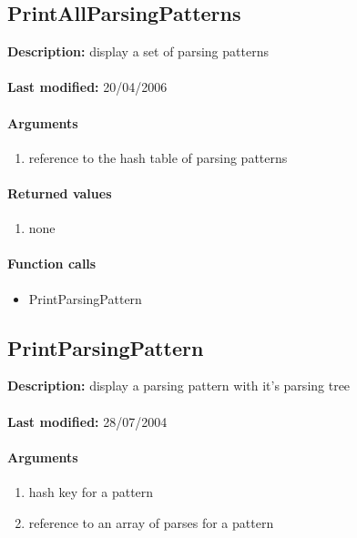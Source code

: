 \subsection{PrintAllParsingPatterns}
\textbf{Description:} display a set of parsing patterns\\
\\\textbf{Last modified:} 20/04/2006

\paragraph{Arguments}
\begin{enumerate}
\item reference to the hash table of parsing patterns
\end{enumerate}

\paragraph{Returned values}
\begin{enumerate}
\item none
\end{enumerate}

\paragraph{Function calls}
\begin{itemize}
\item PrintParsingPattern
\end{itemize}

\subsection{PrintParsingPattern}
\textbf{Description:} display a parsing pattern with it's parsing tree\\
\\\textbf{Last modified:} 28/07/2004

\paragraph{Arguments}
\begin{enumerate}
\item hash key for a pattern
\item reference to an array of parses for a pattern
\end{enumerate}

